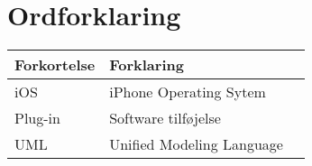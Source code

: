 \chapter*{Ordforklaring}

\begin{tabularx}{\textwidth}{l l X} \hline
	\textbf{Forkortelse}  & \textbf{Forklaring} \\ \hline
	iOS&  iPhone Operating Sytem& \\
	Plug-in&  Software tilføjelse& \\
	UML& Unified Modeling Language& \\
	
\end{tabularx}